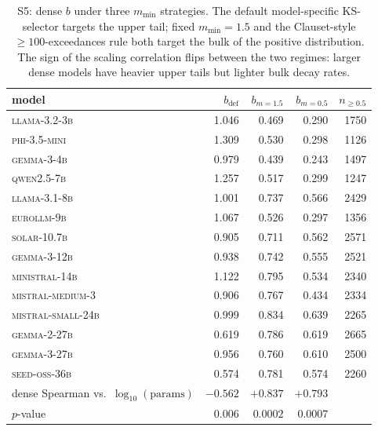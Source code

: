 \documentclass{article}
\newcommand{\sdi}{\ensuremath{b}}
\begin{document}
\begin{table}[h]
\centering
\small
\begin{tabular}{l r r r r}
\toprule
model & \sdi{}$_{\text{def}}$ & \sdi{}$_{m=1.5}$ & \sdi{}$_{m=0.5}$ & $n_{\geq 0.5}$ \\
\midrule
\textsc{llama-3.2-3b}            & 1.046 & 0.469 & 0.290 & 1750 \\
\textsc{phi-3.5-mini}            & 1.309 & 0.530 & 0.298 & 1126 \\
\textsc{gemma-3-4b}              & 0.979 & 0.439 & 0.243 & 1497 \\
\textsc{qwen2.5-7b}              & 1.257 & 0.517 & 0.299 & 1247 \\
\textsc{llama-3.1-8b}            & 1.001 & 0.737 & 0.566 & 2429 \\
\textsc{eurollm-9b}              & 1.067 & 0.526 & 0.297 & 1356 \\
\textsc{solar-10.7b}             & 0.905 & 0.711 & 0.562 & 2571 \\
\textsc{gemma-3-12b}             & 0.938 & 0.742 & 0.555 & 2521 \\
\textsc{ministral-14b}           & 1.122 & 0.795 & 0.534 & 2340 \\
\textsc{mistral-medium-3}        & 0.906 & 0.767 & 0.434 & 2334 \\
\textsc{mistral-small-24b}       & 0.999 & 0.834 & 0.639 & 2265 \\
\textsc{gemma-2-27b}             & 0.619 & 0.786 & 0.619 & 2665 \\
\textsc{gemma-3-27b}             & 0.956 & 0.760 & 0.610 & 2500 \\
\textsc{seed-oss-36b}            & 0.574 & 0.781 & 0.574 & 2260 \\
\midrule
dense Spearman vs.\ $\log_{10}(\text{params})$
                                 & $-0.562$ & $+0.837$ & $+0.793$ &  \\
$p$-value                        & $0.006$  & $0.0002$ & $0.0007$ &  \\
\bottomrule
\end{tabular}
\caption{S5: dense \sdi{} under three $m_{\min}$ strategies. The
default model-specific KS-selector targets the upper tail; fixed
$m_{\min} = 1.5$ and the Clauset-style $\geq 100$-exceedances rule
both target the bulk of the positive distribution. The sign of the
scaling correlation flips between the two regimes: larger dense
models have heavier upper tails but lighter bulk decay
rates.}\label{tab:s5}
\end{table}
\end{document}
